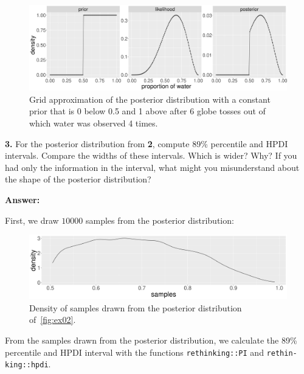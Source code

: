 \documentclass[article]{memoir}
\begin{document}
\begin{figure}[!ht]
\begin{center}
  \includegraphics[width=1\textwidth]{figs/ex02.png}
\end{center}
\caption{Grid approximation of the posterior distribution with a constant prior that is 0 below 0.5 and 1 above after 6 globe tosses out of which water was observed 4 times.}\label{fig:ex02}
\end{figure}

\noindent \textbf{3.} For the posterior distribution from \textbf{2}, compute 89\% percentile and HPDI
intervals. Compare the widths of these intervals. Which is wider? Why? If
you had only the information in the interval, what might you misunderstand
about the shape of the posterior distribution?

\noindent \textbf{Answer:}

First, we draw $10000$ samples from the posterior distribution:



\begin{figure}[!h]
\begin{center}
    \includegraphics[width=0.8\linewidth]{figs/ex03samples.png}
\end{center}
\caption{Density of samples drawn from the posterior distribution of~\autoref{fig:ex02}.}\label{fig:ex3samples}
\end{figure}

From the samples drawn from the posterior distribution, we calculate the 89\% percentile and HPDI interval with the functions \texttt{rethinking::PI} and \texttt{rethin\hyp{}king::hpdi}.
\end{document}
